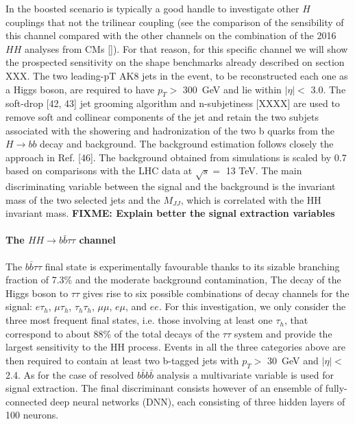 In the boosted scenario  is typically a good handle to investigate other $H$ couplings that not the trilinear coupling (see the comparison of the sensibility of this channel compared with the other channels on the combination of the 2016 $HH$ analyses from CMs []). For that reason, for this specific channel we will show the prospected sensitivity on the shape benchmarks already described on section XXX. The two leading-pT AK8 jets in the event, to be reconstructed each one as a Higgs boson, are required to have $p_T >$ 300~GeV and lie within $|\eta| <$ 3.0. The soft-drop [42, 43] jet grooming algorithm and n-subjetiness [XXXX] are used to remove soft and collinear components of the jet and retain the two subjets associated with the showering and hadronization of the two b quarks from the $H \rightarrow  bb$ decay and background. The background estimation follows closely the approach in Ref. [46]. The background obtained from simulations is scaled by 0.7 based on comparisons with the LHC data at $\sqrt{s} =$ 13 TeV. The main discriminating variable between the signal and the background is the invariant mass of the two selected jets and the $M_{JJ}$, which is correlated with the HH invariant mass. {\bf FIXME: Explain better the signal extraction variables}

\paragraph{The $HH \rightarrow b\bar{b}\tau\tau$ channel}

The $b\bar{b}\tau\tau$ final state is experimentally favourable thanks to its sizable branching fraction of 7.3\% and the moderate background contamination,
The decay of the Higgs boson to $\tau\tau$ gives rise to six possible combinations of decay channels for the signal: $e \tau_h$, $\mu \tau_h$, $\tau_h \tau_h$, $\mu \mu$, $e \mu$, and $e e$. For this investigation, we only consider the three most frequent final states, i.e. those involving at least one $\tau_h$, that correspond to about 88\% of the total decays of the $\tau\tau$ system and provide the largest sensitivity to the HH process. Events in all the three categories above are then required to contain at least two b-tagged jets with $p_T >$ 30~GeV and $|\eta| <$ 2.4. 
As for the case of resolved $b\bar{b}b\bar{b}$ analysis a multivariate variable is used for signal extraction. The final discriminant consists however of an ensemble of fully-connected deep neural networks (DNN), each consisting of three hidden layers of 100 neurons.

